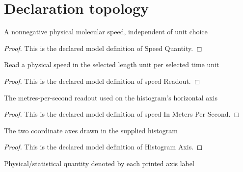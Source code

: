 \section{Declaration topology}
\begin{definition}
  \label{def:physics:phyx-mini-0378:phyxminiproblems-problemphyxmini0378-speedquantity}
  A nonnegative physical molecular speed, independent of unit choice
\end{definition}
\begin{proof}
  This is the declared model definition of Speed Quantity.
\end{proof}
\begin{definition}
  \label{def:physics:phyx-mini-0378:phyxminiproblems-problemphyxmini0378-speedreadout}
  Read a physical speed in the selected length unit per selected time unit
\end{definition}
\begin{proof}
  This is the declared model definition of speed Readout.
\end{proof}
\begin{definition}
  \label{def:physics:phyx-mini-0378:phyxminiproblems-problemphyxmini0378-speedinmeterspersecond}
  The metres-per-second readout used on the histogram's horizontal axis
\end{definition}
\begin{proof}
  This is the declared model definition of speed In Meters Per Second.
\end{proof}
\begin{definition}
  \label{def:physics:phyx-mini-0378:phyxminiproblems-problemphyxmini0378-histogramaxis}
  The two coordinate axes drawn in the supplied histogram
\end{definition}
\begin{proof}
  This is the declared model definition of Histogram Axis.
\end{proof}
\begin{definition}
  \label{def:physics:phyx-mini-0378:phyxminiproblems-problemphyxmini0378-histogramaxisquantity}
  Physical/statistical quantity denoted by each printed axis label
\end{definition}
